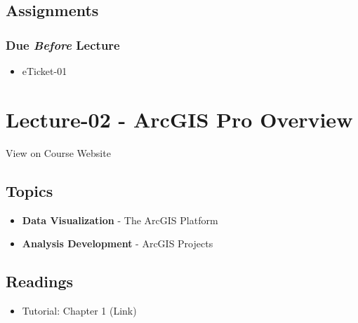 \documentclass[]{book}
\providecommand{\tightlist}{%
  \setlength{\itemsep}{0pt}\setlength{\parskip}{0pt}}
\begin{document}
\hypertarget{assignments-2}{%
\subsection*{Assignments}\label{assignments-2}}

\hypertarget{due-before-lecture}{%
\subsubsection*{\texorpdfstring{Due \emph{Before} Lecture}{Due Before Lecture}}\label{due-before-lecture}}

\begin{itemize}
\tightlist
\item
  eTicket-01
\end{itemize}

\hypertarget{lecture-02---arcgis-pro-overview}{%
\section*{Lecture-02 - ArcGIS Pro Overview}\label{lecture-02---arcgis-pro-overview}}

View on Course Website

\hypertarget{topics-2}{%
\subsection*{Topics}\label{topics-2}}

\begin{itemize}
\tightlist
\item
  \textbf{Data Visualization} - The ArcGIS Platform
\item
  \textbf{Analysis Development} - ArcGIS Projects
\end{itemize}

\hypertarget{readings-3}{%
\subsection*{Readings}\label{readings-3}}

\begin{itemize}
\tightlist
\item
  Tutorial: Chapter 1 (Link)
\end{itemize}
\end{document}
